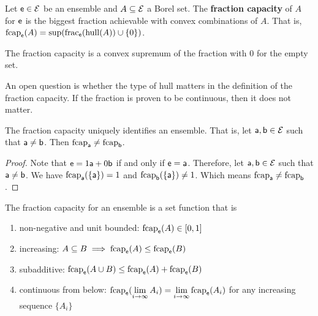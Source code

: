 \begin{mathSection}
	\begin{defn}
		Let $\ens \in \Ens$ be an ensemble and $A \subseteq \Ens$ a Borel set. The \textbf{fraction capacity} of $A$ for $\ens$ is the biggest fraction achievable with convex combinations of $A$. That is, $\fcap_{\ens}(A) = \sup(\fraction_{\ens}(\hull(A))\cup\{0\})$.
	\end{defn}

	\begin{coro}
		The fraction capacity is a convex supremum of the fraction with $0$ for the empty set.
	\end{coro}
	
	\begin{remark}
		An open question is whether the type of hull matters in the definition of the fraction capacity. If the fraction is proven to be continuous, then it does not matter.
	\end{remark}

	\begin{coro}
		The fraction capacity uniquely identifies an ensemble. That is, let $\ens[a], \ens[b] \in \Ens$ such that $\ens[a] \neq \ens[b]$. Then $\fcap_{\ens[a]} \neq \fcap_{\ens[b]}$.
	\end{coro}
	
	\begin{proof}
		Note that $\ens = 1 \ens[a] + 0 \ens[b]$ if and only if $\ens = \ens[a]$. Therefore, let $\ens[a], \ens[b] \in \Ens$ such that $\ens[a] \neq \ens[b]$. We have $\fcap_{\ens[a]}(\{\ens[a]\}) = 1$ and $\fcap_{\ens[b]}(\{\ens[a]\}) \neq 1$. Which means $\fcap_{\ens[a]} \neq \fcap_{\ens[b]}$.
	\end{proof}
	
	\begin{prop}
		The fraction capacity for an ensemble is a set function that is
		\begin{enumerate}
			\item non-negative and unit bounded: $\fcap_{\ens}(A) \in [0,1]$
			\item increasing: $A \subseteq B \implies \fcap_{\ens}(A) \leq \fcap_{\ens}(B)$
			\item subadditive: $\fcap_{\ens}(A \cup B) \leq \fcap_{\ens}(A) + \fcap_{\ens}(B)$
			\item continuous from below: $\fcap_{\ens}(\lim\limits_{i \to \infty} A_i) = \lim\limits_{i \to \infty} \fcap_{\ens}(A_i)$ for any increasing sequence $\{A_i\}$
		\end{enumerate}
	\end{prop}
	

\end{mathSection}
